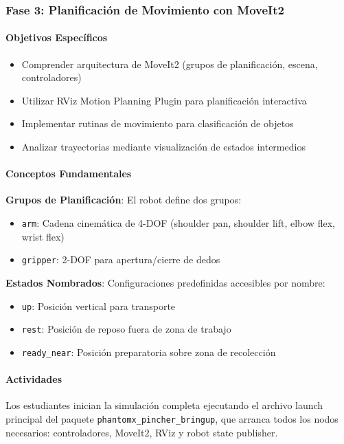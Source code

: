 \subsubsection{Fase 3: Planificación de Movimiento con MoveIt2}

\paragraph{Objetivos Específicos}
\begin{itemize}
    \item Comprender arquitectura de MoveIt2 (grupos de planificación, escena, controladores)
    \item Utilizar RViz Motion Planning Plugin para planificación interactiva
    \item Implementar rutinas de movimiento para clasificación de objetos
    \item Analizar trayectorias mediante visualización de estados intermedios
\end{itemize}

\paragraph{Conceptos Fundamentales}

\textbf{Grupos de Planificación}: El robot define dos grupos:
\begin{itemize}
    \item \texttt{arm}: Cadena cinemática de 4-DOF (shoulder pan, shoulder lift, elbow flex, wrist flex)
    \item \texttt{gripper}: 2-DOF para apertura/cierre de dedos
\end{itemize}

\textbf{Estados Nombrados}: Configuraciones predefinidas accesibles por nombre:
\begin{itemize}
    \item \texttt{up}: Posición vertical para transporte
    \item \texttt{rest}: Posición de reposo fuera de zona de trabajo
    \item \texttt{ready\_near}: Posición preparatoria sobre zona de recolección
\end{itemize}

\paragraph{Actividades}

Los estudiantes inician la simulación completa ejecutando el archivo launch principal del paquete \texttt{phantomx\_pincher\_bringup}, que arranca todos los nodos necesarios: controladores, MoveIt2, RViz y robot state publisher.

